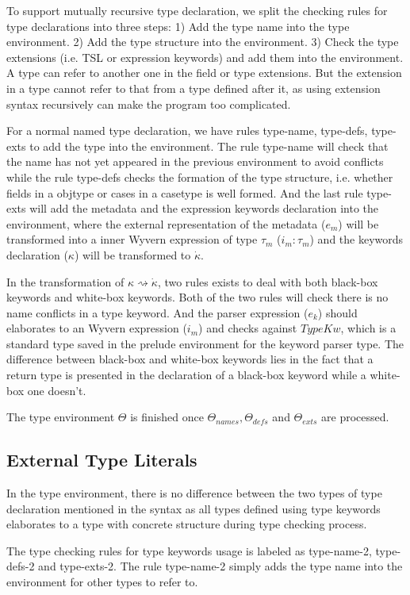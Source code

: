 \documentclass{sig-alternate}
\begin{document}
To support mutually recursive type declaration, we split the checking rules for type declarations into three steps: 1) Add the type name into the type environment. 2) Add the type structure into the environment. 3) Check the type extensions (i.e. TSL or expression keywords) and add them into the environment. A type can refer to another one in the field or type extensions. But the extension in a type cannot refer to that from a type defined after it, as using extension syntax recursively can make the program too complicated.

For a normal named type declaration, we have rules type-name, type-defs, type-exts to add the type into the environment. The rule type-name will check that the name has not yet appeared in the previous environment to avoid conflicts while the rule type-defs checks the formation of the type structure, i.e. whether fields in a objtype or cases in a casetype is well formed. And the last rule type-exts will add the metadata and the expression keywords declaration into the environment, where the external representation of the metadata ($e_m$) will be transformed into a inner Wyvern expression of type $\tau_m$ ($i_m:\tau_m$) and the keywords declaration ($\kappa$) will be transformed to $\dot\kappa$. 

In the transformation of $\kappa\rightsquigarrow\dot\kappa$, two rules exists to deal with both black-box keywords and white-box keywords. Both of the two rules will check there is no name conflicts in a type keyword. And the parser expression ($e_k$) should elaborates to an Wyvern expression ($i_m$) and checks against $TypeKw$, which is a standard type saved in the prelude environment for the keyword parser type. The difference between black-box and white-box keywords lies in the fact that a return type is presented in the declaration of a black-box keyword while a white-box one doesn't.

The type environment $\Theta$ is finished once $\Theta_{names}, \Theta_{defs}$ and $\Theta_{exts}$ are processed.
\subsection{External Type Literals}
In the type environment, there is no difference between the two types of type declaration mentioned in the syntax as all types defined using type keywords elaborates to a type with concrete structure during type checking process.

The type checking rules for type keywords usage is labeled as type-name-2, type-defs-2 and type-exts-2. The rule type-name-2 simply adds the type name into the environment for other types to refer to.
\end{document}
